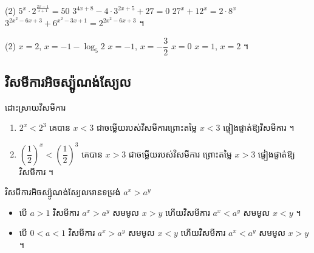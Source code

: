 \begin{pro}
\begin{tasks}(2)
  \task $5^x \cdot 2^{\frac{2x-1}{x+1}} = 50$
  \task $3^{4x+8} - 4 \cdot 3^{2x+5} + 27 = 0$
  \task $27^x + 12^x = 2 \cdot 8^x$
  \task $3^{2x^2-6x+3} + 6^{x^2-3x+1} = 2^{2x^2-6x+3}$ ។
\end{tasks}
\ans
\begin{tasks}(2)
  \task $x = 2$, $x = -1 - \log_5 2$
  \task $x = -1$, $x = -\dfrac{3}{2}$
  \task $x = 0$
  \task $x = 1$, $x = 2$ ។
\end{tasks}
\end{pro}

\subsection{វិសមីការអិចស្ប៉ូណង់ស្យែល}

\begin{example}[ឧទាហរណ៍]
ដោះស្រាយវិសមីការ
\begin{enumerate}[a]
  \item $2^x < 2^3$ គេបាន $x < 3$ ជាចម្លើយរបស់វិសមីការព្រោះតម្លៃ $x < 3$ ផ្ទៀងផ្ទាត់ឱ្យវិសមីការ ។
  \item $\left(\dfrac{1}{2}\right)^x < \left(\dfrac{1}{2}\right)^3$ គេបាន $x > 3$ ជាចម្លើយរបស់វិសមីការ ព្រោះតម្លៃ $x > 3$ ផ្ទៀងផ្ទាត់ឱ្យវិសមីការ ។
\end{enumerate}
\end{example}

\begin{formulaBox}[ជាទូទៅ]
វិសមីការអិចស្ប៉ូណង់ស្យែលមានទម្រង់ $a^x > a^y$
\begin{itemize}
  \item បើ $a > 1$ វិសមីការ $a^x > a^y$ សមមូល $x > y$ ហើយវិសមីការ $a^x < a^y$ សមមូល $x < y$ ។
  \item បើ $0 < a < 1$ វិសមីការ $a^x > a^y$ សមមូល $x < y$ ហើយវិសមីការ $a^x < a^y$ សមមូល $x > y$ ។
\end{itemize}
\end{formulaBox}

